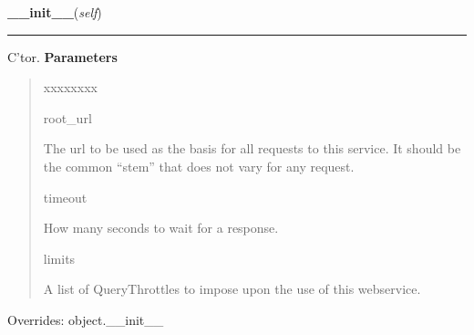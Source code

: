 \hspace{.8\funcindent}\begin{boxedminipage}{\funcwidth}

    \raggedright \textbf{\_\_init\_\_}(\textit{self})

    \vspace{-1.5ex}

    \rule{\textwidth}{0.5\fboxrule}
\setlength{\parskip}{2ex}

C'tor.
\setlength{\parskip}{1ex}
      \textbf{Parameters}
      \vspace{-1ex}

      \begin{quote}
        \begin{Ventry}{xxxxxxxx}

          \item[root\_url]


The url to be used as the basis for all requests to this service.
It should be the common ``stem'' that does not vary for any request.
          \item[timeout]


How many seconds to wait for a response.
          \item[limits]


A list of QueryThrottles to impose upon the use of this webservice.
        \end{Ventry}

      \end{quote}

      Overrides: object.\_\_init\_\_

    \end{boxedminipage}

    \label{biblio:webquery:worldcat:WorldcatQuery:query_mdata_by_isbn}

    \vspace{0.5ex}

